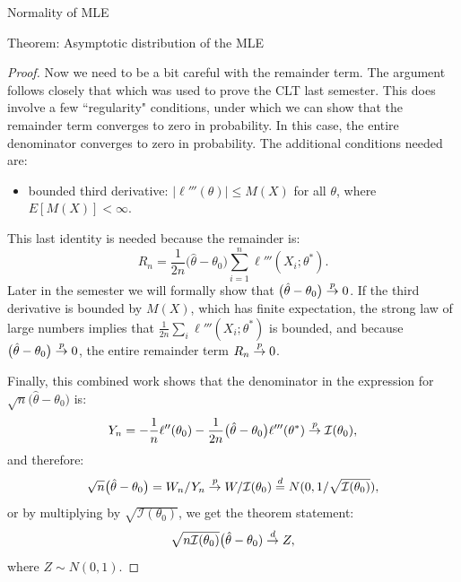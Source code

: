 \begin{frame}[allowframebreaks]{Normality of MLE}
\begin{block}{Theorem: Asymptotic distribution of the MLE}
{\begin{proof}
      Now we need to be a bit careful with the remainder term. The argument follows closely that which was used to prove the CLT last semester. This does involve a few ``regularity" conditions, under which we can show that the remainder term converges to zero in probability. In this case, the entire denominator converges to zero in probability. The additional conditions needed are:
      \begin{itemize}
        \item bounded third derivative: $|\ell'''(\theta)| \leq M(X)$ for all $\theta$, where $E[M(X)] < \infty$.
      \end{itemize}
      This last identity is needed because the remainder is:
      $$
      R_n = \frac{1}{2n}\big(\hat{\theta} - \theta_0\big)\sum_{i = 1}^n \ell'''(X_i; \theta^*).
      $$
      Later in the semester we will formally show that $\big(\hat{\theta} - \theta_0\big)\overset{p}{\rightarrow} 0$. If the third derivative is bounded by $M(X)$, which has finite expectation, the strong law of large numbers implies that $\frac{1}{2n}\sum_i \ell'''(X_i;\theta^*)$ is bounded, and because $\big(\hat{\theta} - \theta_0\big)\overset{p}{\rightarrow} 0$, the entire remainder term $R_n \overset{p}{\rightarrow} 0$.

      Finally, this combined work shows that the denominator in the expression for $\sqrt{n}\big(\hat{\theta} - \theta_0\big)$ is:
      $$
      Y_n = -\frac{1}{n}\ell''(\theta_0) - \frac{1}{2n} \big(\hat{\theta} - \theta_0\big) \ell'''(\theta^*) \overset{p}{\rightarrow} \mathcal{I}(\theta_0),
      $$
      and therefore:
      $$
      \sqrt{n}\big(\hat{\theta} - \theta_0\big) = W_n / Y_n \overset{p}{\rightarrow} W/\mathcal{I}(\theta_0) \overset{d}{=} N(0, 1/\sqrt{\mathcal{I}(\theta_0)}),
      $$
      or by multiplying by $\sqrt{\mathcal{I}(\theta_0)}$, we get the theorem statement:
      $$
      \sqrt{n\mathcal{I}(\theta_0)}\big(\hat{\theta} - \theta_0) \overset{d}{\rightarrow} Z,
      $$
      where $Z \sim N(0, 1)$.
    \end{proof}
    }

  \end{block}

  \framebreak


\end{frame}
